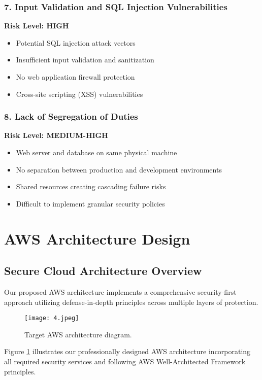 \documentclass[12pt]{article}
\begin{document}
\subsubsection{7. Input Validation and SQL Injection Vulnerabilities}

\textbf{Risk Level: HIGH}
\begin{itemize}
\item Potential SQL injection attack vectors
\item Insufficient input validation and sanitization
\item No web application firewall protection
\item Cross-site scripting (XSS) vulnerabilities
\end{itemize}

\subsubsection{8. Lack of Segregation of Duties}

\textbf{Risk Level: MEDIUM-HIGH}
\begin{itemize}
\item Web server and database on same physical machine
\item No separation between production and development environments
\item Shared resources creating cascading failure risks
\item Difficult to implement granular security policies
\end{itemize}

\section{AWS Architecture Design}

\subsection{Secure Cloud Architecture Overview}

Our proposed AWS architecture implements a comprehensive security-first approach utilizing defense-in-depth principles across multiple layers of protection.

\begin{figure}[H]
\centering
\texttt{[image: 4.jpeg]}
\caption{Target AWS architecture diagram.}
\label{fig:aws_architecture}
\end{figure}

Figure \ref{fig:aws_architecture} illustrates our professionally designed AWS architecture incorporating all required security services and following AWS Well-Architected Framework principles.
\end{document}
